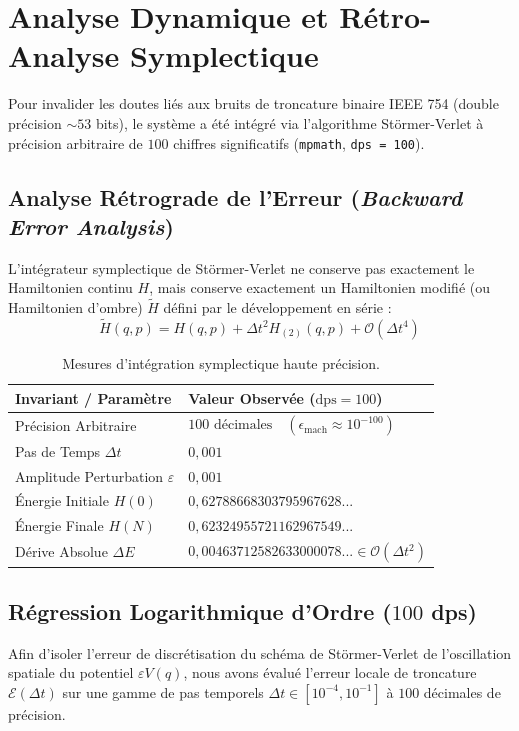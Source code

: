 \documentclass[10pt,twocolumn,a4paper]{article}
\begin{document}
\section{Analyse Dynamique et Rétro-Analyse Symplectique}

Pour invalider les doutes liés aux bruits de troncature binaire IEEE 754 (double précision $\sim 53$ bits), le système a été intégré via l'algorithme Störmer-Verlet à précision arbitraire de $100$ chiffres significatifs (\texttt{mpmath}, \texttt{dps = 100}).

\subsection{Analyse Rétrograde de l'Erreur (\textit{Backward Error Analysis})}
L'intégrateur symplectique de Störmer-Verlet ne conserve pas exactement le Hamiltonien continu $H$, mais conserve exactement un Hamiltonien modifié (ou Hamiltonien d'ombre) $\tilde{H}$ défini par le développement en série :
\begin{equation}
\tilde{H}(q, p) = H(q, p) + \Delta t^2 H_{(2)}(q, p) + \mathcal{O}(\Delta t^4)
\end{equation}

\begin{table}[h]
\centering
\small
\begin{tabular}{@{}ll@{}}
\toprule
\textbf{Invariant / Paramètre} & \textbf{Valeur Observée ($\text{dps} = 100$)} \\ \midrule
Précision Arbitraire & $100\text{ décimales} \quad (\epsilon_{\text{mach}} \approx 10^{-100})$ \\
Pas de Temps $\Delta t$ & $0{,}001$ \\
Amplitude Perturbation $\varepsilon$ & $0{,}001$ \\
Énergie Initiale $H(0)$ & $0{,}62788668303795967628...$ \\
Énergie Finale $H(N)$ & $0{,}62324955721162967549...$ \\
Dérive Absolue $\Delta E$ & $0{,}00463712582633000078... \in \mathcal{O}(\Delta t^2)$ \\ \bottomrule
\end{tabular}
\caption{Mesures d'intégration symplectique haute précision.}
\end{table}

\subsection{Régression Logarithmique d'Ordre ($100$ dps)}
Afin d'isoler l'erreur de discrétisation du schéma de Störmer-Verlet de l'oscillation spatiale du potentiel $\varepsilon V(q)$, nous avons évalué l'erreur locale de troncature $\mathcal{E}(\Delta t)$ sur une gamme de pas temporels $\Delta t \in [10^{-4}, 10^{-1}]$ à $100$ décimales de précision.
\end{document}
